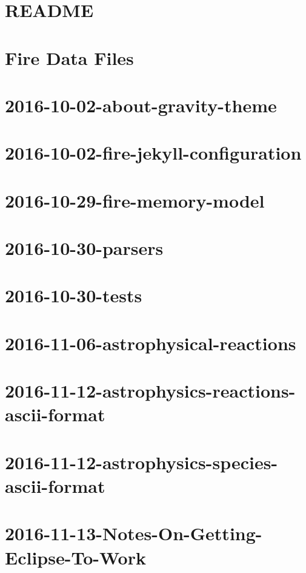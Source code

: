 \documentclass[twoside]{book}
\newcommand{\+}{\discretionary{\mbox{\scriptsize$\hookleftarrow$}}{}{}}
\begin{document}
\chapter{R\+E\+A\+D\+ME}
\label{a02169}

\chapter{Fire Data Files}
\label{a02170}

\chapter{2016-\/10-\/02-\/about-\/gravity-\/theme}
\label{a02171}

\chapter{2016-\/10-\/02-\/fire-\/jekyll-\/configuration}
\label{a02172}

\chapter{2016-\/10-\/29-\/fire-\/memory-\/model}
\label{a02173}

\chapter{2016-\/10-\/30-\/parsers}
\label{a02174}

\chapter{2016-\/10-\/30-\/tests}
\label{a02175}

\chapter{2016-\/11-\/06-\/astrophysical-\/reactions}
\label{a02176}

\chapter{2016-\/11-\/12-\/astrophysics-\/reactions-\/ascii-\/format}
\label{a02177}

\chapter{2016-\/11-\/12-\/astrophysics-\/species-\/ascii-\/format}
\label{a02178}

\chapter{2016-\/11-\/13-\/\+Notes-\/\+On-\/\+Getting-\/\+Eclipse-\/\+To-\/\+Work}
\label{a02179}

\end{document}

